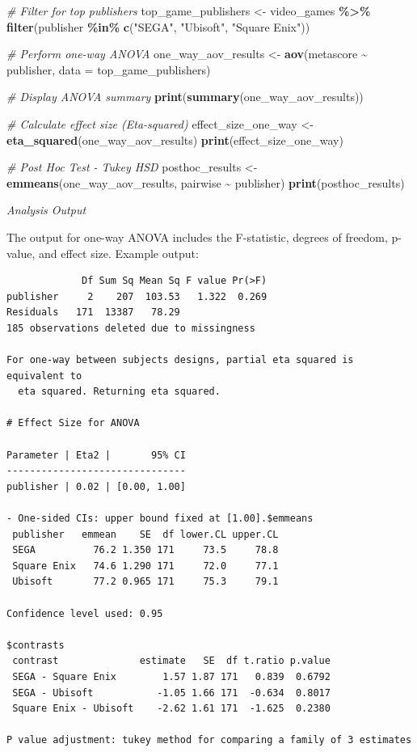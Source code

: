 \documentclass[
]{book}
\newenvironment{Shaded}{\begin{snugshade}}{\end{snugshade}}
\newcommand{\AttributeTok}[1]{\textcolor[rgb]{0.13,0.29,0.53}{#1}}
\newcommand{\CommentTok}[1]{\textcolor[rgb]{0.56,0.35,0.01}{\textit{#1}}}
\newcommand{\FunctionTok}[1]{\textcolor[rgb]{0.13,0.29,0.53}{\textbf{#1}}}
\newcommand{\NormalTok}[1]{#1}
\newcommand{\OtherTok}[1]{\textcolor[rgb]{0.56,0.35,0.01}{#1}}
\newcommand{\SpecialCharTok}[1]{\textcolor[rgb]{0.81,0.36,0.00}{\textbf{#1}}}
\newcommand{\StringTok}[1]{\textcolor[rgb]{0.31,0.60,0.02}{#1}}
\begin{document}
\begin{Shaded}
\begin{Highlighting}[]
\CommentTok{\# Filter for top publishers}
\NormalTok{top\_game\_publishers }\OtherTok{\textless{}{-}}\NormalTok{ video\_games }\SpecialCharTok{\%\textgreater{}\%}
  \FunctionTok{filter}\NormalTok{(publisher }\SpecialCharTok{\%in\%} \FunctionTok{c}\NormalTok{(}\StringTok{"SEGA"}\NormalTok{, }\StringTok{"Ubisoft"}\NormalTok{, }\StringTok{"Square Enix"}\NormalTok{))}

\CommentTok{\# Perform one{-}way ANOVA}
\NormalTok{one\_way\_aov\_results }\OtherTok{\textless{}{-}} \FunctionTok{aov}\NormalTok{(metascore }\SpecialCharTok{\textasciitilde{}}\NormalTok{ publisher, }\AttributeTok{data =}\NormalTok{ top\_game\_publishers)}

\CommentTok{\# Display ANOVA summary}
\FunctionTok{print}\NormalTok{(}\FunctionTok{summary}\NormalTok{(one\_way\_aov\_results))}

\CommentTok{\# Calculate effect size (Eta{-}squared)}
\NormalTok{effect\_size\_one\_way }\OtherTok{\textless{}{-}} \FunctionTok{eta\_squared}\NormalTok{(one\_way\_aov\_results)}
\FunctionTok{print}\NormalTok{(effect\_size\_one\_way)}

\CommentTok{\# Post Hoc Test {-} Tukey HSD}
\NormalTok{posthoc\_results }\OtherTok{\textless{}{-}} \FunctionTok{emmeans}\NormalTok{(one\_way\_aov\_results, pairwise }\SpecialCharTok{\textasciitilde{}}\NormalTok{ publisher)}
\FunctionTok{print}\NormalTok{(posthoc\_results)}
\end{Highlighting}
\end{Shaded}

\emph{Analysis Output}

The output for one-way ANOVA includes the F-statistic, degrees of freedom, p-value, and effect size. Example output:

\begin{verbatim}
             Df Sum Sq Mean Sq F value Pr(>F)
publisher     2    207  103.53   1.322  0.269
Residuals   171  13387   78.29               
185 observations deleted due to missingness

For one-way between subjects designs, partial eta squared is equivalent to
  eta squared. Returning eta squared.
  
# Effect Size for ANOVA

Parameter | Eta2 |       95% CI
-------------------------------
publisher | 0.02 | [0.00, 1.00]

- One-sided CIs: upper bound fixed at [1.00].$emmeans
 publisher   emmean    SE  df lower.CL upper.CL
 SEGA          76.2 1.350 171     73.5     78.8
 Square Enix   74.6 1.290 171     72.0     77.1
 Ubisoft       77.2 0.965 171     75.3     79.1

Confidence level used: 0.95 

$contrasts
 contrast              estimate   SE  df t.ratio p.value
 SEGA - Square Enix        1.57 1.87 171   0.839  0.6792
 SEGA - Ubisoft           -1.05 1.66 171  -0.634  0.8017
 Square Enix - Ubisoft    -2.62 1.61 171  -1.625  0.2380

P value adjustment: tukey method for comparing a family of 3 estimates 
\end{verbatim}
\end{document}
